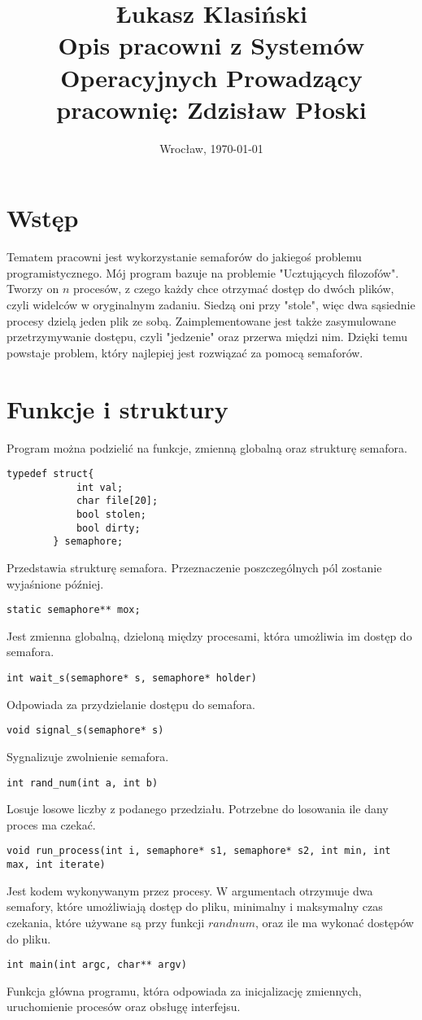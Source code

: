 \documentclass[11pt, wide]{article}
\date{Wrocław, \today}
\title{Łukasz Klasiński\\\LARGE\textbf{Opis pracowni z Systemów Operacyjnych}
    Prowadzący pracownię: Zdzisław Płoski}
\begin{document}
    \maketitle
    \thispagestyle{empty}
    \section{Wstęp}
    Tematem pracowni jest wykorzystanie semaforów do jakiegoś problemu programistycznego. 
    Mój program bazuje na problemie "Ucztujących filozofów". Tworzy on 
    $n$ procesów, z czego każdy chce otrzymać dostęp do dwóch plików, czyli widelców w oryginalnym 
    zadaniu. Siedzą oni przy "stole", więc dwa sąsiednie procesy dzielą jeden plik ze sobą. 
    Zaimplementowane jest także zasymulowane przetrzymywanie dostępu, czyli "jedzenie" oraz przerwa międzi nim.
    Dzięki temu powstaje problem, który najlepiej jest rozwiązać za pomocą semaforów.
    \section{Funkcje i struktury}
    Program można podzielić na funkcje, zmienną globalną oraz strukturę semafora.
    \begin{lstlisting}[style=CStyle]
        typedef struct{
            int val;
            char file[20];
            bool stolen;
            bool dirty;
        } semaphore;\end{lstlisting}
    Przedstawia strukturę semafora. Przeznaczenie poszczególnych pól zostanie wyjaśnione później.
    \begin{lstlisting}[style=CStyle]
                static semaphore** mox;\end{lstlisting}
    Jest zmienna globalną, dzieloną między procesami, która umożliwia im dostęp do semafora.
    \begin{lstlisting}[style=CStyle]
        int wait_s(semaphore* s, semaphore* holder)\end{lstlisting}
    Odpowiada za przydzielanie dostępu do semafora.
    \begin{lstlisting}[style=CStyle]
        void signal_s(semaphore* s)\end{lstlisting}
    Sygnalizuje zwolnienie semafora.
    \begin{lstlisting}[style=CStyle]         
    int rand_num(int a, int b)\end{lstlisting}
    Losuje losowe liczby z podanego przedziału. Potrzebne do losowania ile dany proces ma czekać.
    \begin{lstlisting}[style=CStyle]
        void run_process(int i, semaphore* s1, semaphore* s2, int min, int max, int iterate)\end{lstlisting}
        Jest kodem wykonywanym przez procesy. W argumentach otrzymuje dwa semafory, które umożliwiają dostęp do pliku,
        minimalny i maksymalny czas czekania, które używane są przy funkcji $randnum$, oraz ile ma wykonać dostępów do pliku.
    \begin{lstlisting}[style=CStyle]
        int main(int argc, char** argv)\end{lstlisting}
        Funkcja główna programu, która odpowiada za inicjalizację zmiennych, uruchomienie procesów oraz obsługę interfejsu.
\end{document}
